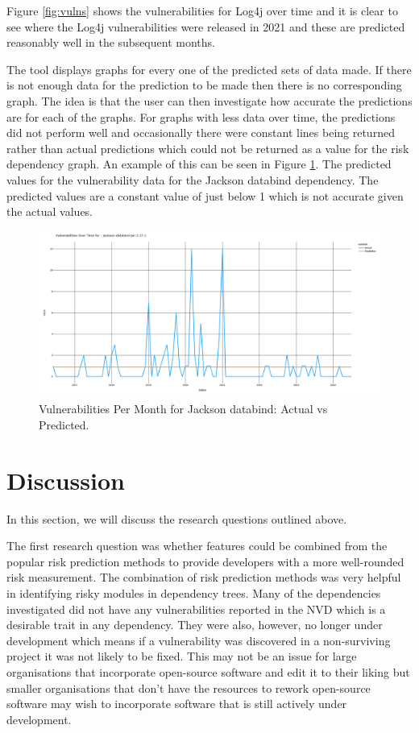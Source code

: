 \documentclass[conference]{IEEEtran}
\begin{document}
{Figure \ref{fig:vulns} shows the vulnerabilities for Log4j over time and it is clear to see where the Log4j vulnerabilities were released in 2021 and these are predicted reasonably well in the subsequent months. 

The tool displays graphs for every one of the predicted sets of data made. If there is not enough data for the prediction to be made then there is no corresponding graph. The idea is that the user can then investigate how accurate the predictions are for each of the graphs. For graphs with less data over time, the predictions did not perform well and occasionally there were constant lines being returned rather than actual predictions which could not be returned as a value for the risk dependency graph. An example of this can be seen in Figure \ref{fig:const}. The predicted values for the vulnerability data for the Jackson databind dependency. The predicted values are a constant value of just below 1 which is not accurate given the actual values. 

\begin{figure}
    \centering
    \includegraphics[width=1\linewidth]{Const.png}
    \caption{Vulnerabilities Per Month for Jackson databind: Actual vs Predicted.} 
    \label{fig:const}
\end{figure}

\section{Discussion}
In this section, we will discuss the research questions outlined above. 

The first research question was whether features could be combined from the popular risk prediction methods to provide developers with a more well-rounded risk measurement. The combination of risk prediction methods was very helpful in identifying risky modules in dependency trees. Many of the dependencies investigated did not have any vulnerabilities reported in the NVD which is a desirable trait in any dependency. They were also, however, no longer under development which means if a vulnerability was discovered in a non-surviving project it was not likely to be fixed. This may not be an issue for large organisations that incorporate open-source software and edit it to their liking but smaller organisations that don't have the resources to rework open-source software may wish to incorporate software that is still actively under development.

}
\end{document}
